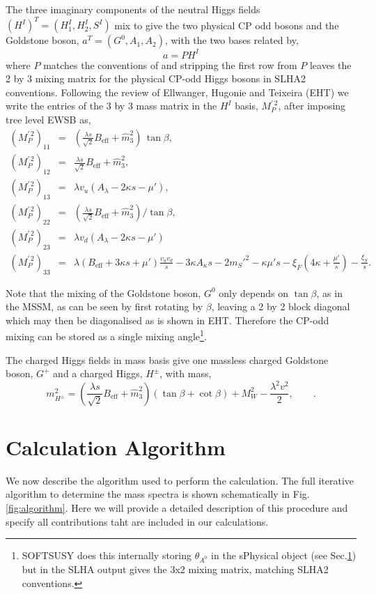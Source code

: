 \documentclass[final,3p,times,pdflatex]{elsarticle}
\newcommand{\be}{\begin{equation}}
\newcommand{\ee}{\end{equation}}
\newcommand{\ba}{\begin{eqnarray}}
\newcommand{\ea}{\end{eqnarray}}
\newcommand{\ds}{\displaystyle}
\begin{document}
The three imaginary components of the neutral Higgs fields $(H^I)^T = (H^I_1, H_2^I, S^I)$ mix to give the two physical CP odd bosons and the Goldstone boson, $a^T = (G^0, A_1, A_2)$, with the two bases related by,
 \be a = P H^I \ee where $P$ matches the conventions of \cite{Degrassi:2009yq} and stripping the first row from $P$ leaves the 2 by 3 mixing matrix for the physical CP-odd Higgs bosons in SLHA2 conventions\cite{Allanach:2008qq}. Following the review of Ellwanger, Hugonie and Teixeira (EHT)\cite{Ellwanger:2009dp} we write the entries of the 3 by 3 mass matrix in the $H^I$ basis, $ M^{\prime \, 2}_{P}$, after imposing tree level EWSB as,
\ba
( M^{\prime \, 2}_{P})_{11} & = & (\ds\frac{\lambda s}{\sqrt{2}} B_\textrm{eff} +
\widehat{m}_3^2)\,\tan\beta , \\
( M^{\prime \, 2}_{P})_{12} & = & \ds\frac{\lambda s}{\sqrt{2}} B_\textrm{eff} +
\widehat{m}_3^2, \\
( M^{\prime \, 2}_{P})_{13} & = & \lambda v_u (A_\lambda - 2\kappa s - \mu'), \\
( M^{\prime \, 2}_{P})_{22} & = & (\ds\frac{\lambda s}{\sqrt{2}} B_\textrm{eff} +
\widehat{m}_3^2)/\tan\beta ,  \\
( M^{\prime \, 2}_{P})_{23} & = & \lambda v_d (A_\lambda - 2\kappa s - \mu')\\
( M^{\prime \, 2}_{P})_{33} & = & \lambda (B_\textrm{eff}+3\kappa s +\mu')\ds\frac{v_u
v_d}{s} -3\kappa A_\kappa s  -2 m_{S}'^2 -\kappa \mu' s 
-\xi_F\left(4\kappa + \frac{\mu'}{s}\right) -\ds\frac{\xi_S}{s}.
\label{eq:MA0}
\ea

Note that the mixing of the Goldstone boson, $G^0$ only depends on $\tan\beta$, as in the MSSM, as can be seen by first rotating by $\beta$, leaving a 2 by 2 block diagonal which may then be diagonalised as is shown in EHT\cite{Ellwanger:2009dp}.  Therefore the CP-odd mixing can be stored as a single mixing angle\footnote{SOFTSUSY does this internally storing $\theta_{A^0}$ in the sPhysical object (see Sec.\ref{}) but in the SLHA output gives the 3x2 mixing matrix, matching SLHA2 conventions.}.


The charged Higgs fields in mass basis give one massless charged Goldstone boson, $G^+$ and a charged Higgs, $H^\pm$, with mass,
\be m_{H^\pm}^2 = \left(\ds\frac{\lambda s}{\sqrt{2}} B_\textrm{eff} +
\widehat{m}_3^2\right)(\tan \beta + \cot \beta) + M_W^2 - \ds\frac{\lambda^2 v^2}{2},\qquad. \ee
  
\section{Calculation Algorithm \label{sec:calculation}}
We now describe the algorithm used to perform the calculation.  The full iterative algorithm to determine the mass spectra is shown schematically in Fig.\ref{fig:algorithm}.  Here we will provide a detailed description of this procedure and specify all contributions taht are included in our calculations.  
\end{document}
